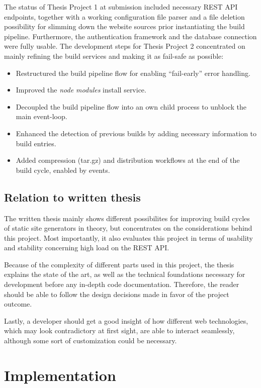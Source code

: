 \documentclass[a4paper,english,11pt]{report}
\begin{document}
The status of Thesis Project 1 at submission included necessary REST API endpoints, together with a working configuration file parser and a file deletion possibility for slimming down the website sources prior instantiating the build pipeline. Furthermore, the authentication framework and the database connection were fully usable. The development steps for Thesis Project 2 concentrated on mainly refining the build services and making it as fail-safe as possible:

\begin{itemize}
  \item Restructured the build pipeline flow for enabling ``fail-early'' error handling.
  \item Improved the \emph{node modules} install service.
  \item Decoupled the build pipeline flow into an own child process to unblock the main event-loop.
  \item Enhanced the detection of previous builds by adding necessary information to build entries.
  \item Added compression (tar.gz) and distribution workflows at the end of the build cycle, enabled by events.
\end{itemize}

\section{Relation to written thesis}
\label{sec:relation-thesis}
The written thesis mainly shows different possibilites for improving build cycles of static site generators in theory, but concentrates on the considerations behind this project. Most importantly, it also evaluates this project in terms of usability and stability concerning high load on the REST API.

Because of the complexity of different parts used in this project, the thesis explains the state of the art, as well as the technical foundations necessary for development before any in-depth code documentation. Therefore, the reader should be able to follow the design decisions made in favor of the project outcome.

Lastly, a developer should get a good insight of how different web technologies, which may look contradictory at first sight, are able to interact seamlessly, although some sort of customization could be necessary.
%

\chapter{Implementation}
\end{document}
